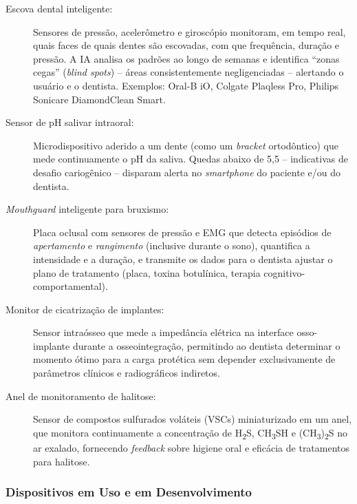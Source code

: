 \begin{description}
  \item[Escova dental inteligente:] Sensores de pressão, acelerômetro e
    giroscópio monitoram, em tempo real, quais faces de quais dentes são
    escovadas, com que frequência, duração e pressão. A IA analisa os padrões
    ao longo de semanas e identifica ``zonas cegas'' (\textit{blind spots})
    -- áreas consistentemente negligenciadas -- alertando o usuário e o
    dentista. Exemplos: Oral-B iO, Colgate Plaqless Pro, Philips Sonicare
    DiamondClean Smart.

  \item[Sensor de pH salivar intraoral:] Microdispositivo aderido a um dente
    (como um \textit{bracket} ortodôntico) que mede continuamente o pH da
    saliva. Quedas abaixo de 5,5 -- indicativas de desafio cariogênico --
    disparam alerta no \textit{smartphone} do paciente e/ou do dentista.

  \item[\textit{Mouthguard} inteligente para bruxismo:] Placa oclusal com
    sensores de pressão e EMG que detecta episódios de \textit{apertamento}
    e \textit{rangimento} (inclusive durante o sono), quantifica a intensidade
    e a duração, e transmite os dados para o dentista ajustar o plano de
    tratamento (placa, toxina botulínica, terapia cognitivo-comportamental).

  \item[Monitor de cicatrização de implantes:] Sensor intraósseo que mede a
    impedância elétrica na interface osso-implante durante a osseointegração,
    permitindo ao dentista determinar o momento ótimo para a carga protética
    sem depender exclusivamente de parâmetros clínicos e radiográficos
    indiretos.

  \item[Anel de monitoramento de halitose:] Sensor de compostos sulfurados
    voláteis (VSCs) miniaturizado em um anel, que monitora continuamente a
    concentração de H\textsubscript{2}S, CH\textsubscript{3}SH e
    (CH\textsubscript{3})\textsubscript{2}S no ar exalado, fornecendo
    \textit{feedback} sobre higiene oral e eficácia de tratamentos para
    halitose.
\end{description}

\subsubsection{Dispositivos em Uso e em Desenvolvimento}

